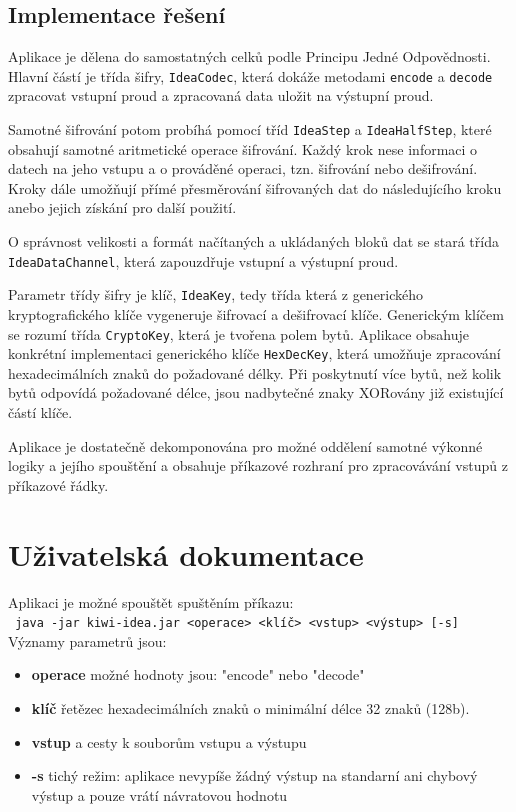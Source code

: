 \documentclass[12pt,a4paper]{article}
\let\oldsection\section
\renewcommand\section{\clearpage\oldsection}
\begin{document}
\subsection{Implementace řešení}
Aplikace je dělena do samostatných celků podle Principu Jedné Odpovědnosti. Hlavní částí je třída šifry, \texttt{IdeaCodec}, která dokáže metodami \texttt{encode} a \texttt{decode} zpracovat vstupní proud a zpracovaná data uložit na výstupní proud.

Samotné šifrování potom probíhá pomocí tříd \texttt{IdeaStep} a \texttt{IdeaHalfStep}, které obsahují samotné aritmetické operace šifrování. Každý krok nese informaci o datech na jeho vstupu a o prováděné operaci, tzn. šifrování nebo dešifrování.
Kroky dále umožňují přímé přesměrování šifrovaných dat do následujícího kroku anebo jejich získání pro další použití.

O správnost velikosti a formát načítaných a ukládaných bloků dat se stará třída \texttt{IdeaDataChannel}, která zapouzdřuje vstupní a výstupní proud.

Parametr třídy šifry je klíč, \texttt{IdeaKey}, tedy třída která z generického kryptografického klíče vygeneruje šifrovací a dešifrovací klíče. Generickým klíčem se rozumí třída \texttt{CryptoKey}, která je tvořena polem bytů.
Aplikace obsahuje konkrétní implementaci generického klíče \texttt{HexDecKey}, která umožňuje zpracování hexadecimálních znaků do požadované délky. Při poskytnutí více bytů, než kolik bytů odpovídá požadované délce, jsou nadbytečné znaky XORovány již existující částí klíče.

Aplikace je dostatečně dekomponována pro možné oddělení samotné výkonné logiky a jejího spouštění a obsahuje příkazové rozhraní pro zpracovávání vstupů z příkazové řádky.

\section{Uživatelská dokumentace}
Aplikaci je možné spouštět spuštěním příkazu:\\
{\centering \texttt{ java -jar kiwi-idea.jar <operace> <klíč> <vstup> <výstup> [-s]}}
Významy parametrů jsou:
\begin{itemize}
	\item \textbf{operace} možné hodnoty jsou: "encode" nebo "decode"
	\item \textbf{klíč} řetězec hexadecimálních znaků o minimální délce 32 znaků (128b).
	\item \textbf{vstup} a  cesty k souborům vstupu a výstupu
	\item  \textbf{\lbrack-s\rbrack} tichý režim: aplikace nevypíše žádný výstup na standarní ani chybový výstup a pouze vrátí návratovou hodnotu
\end{itemize}
\end{document}
